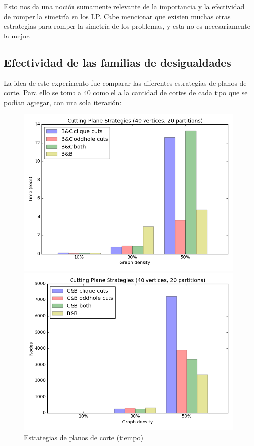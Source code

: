 Esto nos da una noción sumamente relevante de la importancia y la efectividad de romper la simetría en los LP. Cabe mencionar que existen muchas otras estrategias para romper la simetría de los problemas, y esta no es necesariamente la mejor.

\pagebreak

\subsection{Efectividad de las familias de desigualdades}

La idea de este experimento fue comparar las diferentes estrategias de planos de corte. Para ello se tomo a 40 como el a la cantidad de cortes de cada tipo que se podían agregar, con una sola iteración:

\begin{figure}[h]
  \centering
  \begin{minipage}[b]{0.49\textwidth}
    \includegraphics[width=\textwidth]{img/5-cuts_v40_p20_i1_l40_t1_b0.png}
    \caption{Estrategias de planos de corte (tiempo)}
  \end{minipage}
  \hfill
  \begin{minipage}[b]{0.49\textwidth}
    \includegraphics[width=\textwidth]{img/5-cuts_v40_p20_i1_l40_t1_b0_nodes.png}

\end{minipage}
\end{figure}

